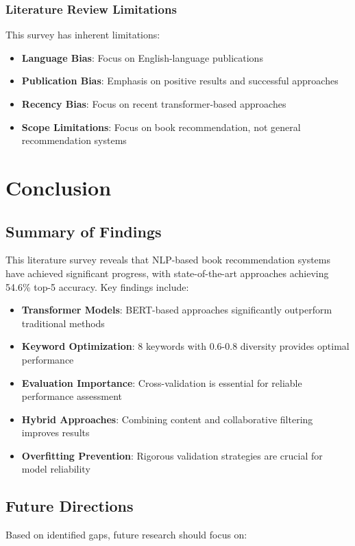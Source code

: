 \documentclass[12pt,a4paper]{article}
\begin{document}
\subsubsection{Literature Review Limitations}
This survey has inherent limitations:
\begin{itemize}
    \item \textbf{Language Bias}: Focus on English-language publications
    \item \textbf{Publication Bias}: Emphasis on positive results and successful approaches
    \item \textbf{Recency Bias}: Focus on recent transformer-based approaches
    \item \textbf{Scope Limitations}: Focus on book recommendation, not general recommendation systems
\end{itemize}


\section{Conclusion}

\subsection{Summary of Findings}
This literature survey reveals that NLP-based book recommendation systems have achieved significant progress, with state-of-the-art approaches achieving 54.6\% top-5 accuracy. Key findings include:

\begin{itemize}
    \item \textbf{Transformer Models}: BERT-based approaches significantly outperform traditional methods
    \item \textbf{Keyword Optimization}: 8 keywords with 0.6-0.8 diversity provides optimal performance
    \item \textbf{Evaluation Importance}: Cross-validation is essential for reliable performance assessment
    \item \textbf{Hybrid Approaches}: Combining content and collaborative filtering improves results
    \item \textbf{Overfitting Prevention}: Rigorous validation strategies are crucial for model reliability
\end{itemize}

\subsection{Future Directions}
Based on identified gaps, future research should focus on:
\end{document}
